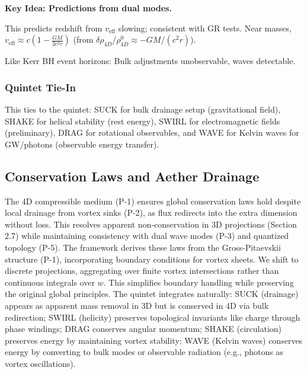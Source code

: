 \textbf{Key Idea: Predictions from dual modes.}

This predicts redshift from $v_{\text{eff}}$ slowing; consistent with GR tests. Near masses, $v_{\text{eff}} \approx c \left(1 - \frac{G M}{2 c^2 r}\right)$ (from $\delta \rho_{4D} / \rho_{4D}^0 \approx - G M / (c^2 r)$).

Like Kerr BH event horizons: Bulk adjustments unobservable, waves detectable.

\subsubsection{Quintet Tie-In}

This ties to the quintet: SUCK for bulk drainage setup (gravitational field), SHAKE for helical stability (rest energy), SWIRL for electromagnetic fields (preliminary), DRAG for rotational observables, and WAVE for Kelvin waves for GW/photons (observable energy transfer).


\subsection{Conservation Laws and Aether Drainage}

The 4D compressible medium (P-1) ensures global conservation laws hold despite local drainage from vortex sinks (P-2), as flux redirects into the extra dimension without loss. This resolves apparent non-conservation in 3D projections (Section 2.7) while maintaining consistency with dual wave modes (P-3) and quantized topology (P-5). The framework derives these laws from the Gross-Pitaevskii structure (P-1), incorporating boundary conditions for vortex sheets. We shift to discrete projections, aggregating over finite vortex intersections rather than continuous integrals over $w$. This simplifies boundary handling while preserving the original global principles. The quintet integrates naturally: SUCK (drainage) appears as apparent mass removal in 3D but is conserved in 4D via bulk redirection; SWIRL (helicity) preserves topological invariants like charge through phase windings; DRAG conserves angular momentum; SHAKE (circulation) preserves energy by maintaining vortex stability; WAVE (Kelvin waves) conserves energy by converting to bulk modes or observable radiation (e.g., photons as vortex oscillations).

